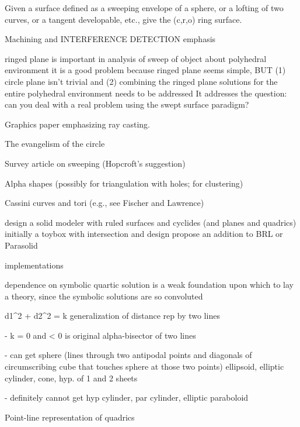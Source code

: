 Given a surface defined as a sweeping envelope of a sphere,
or a lofting of two curves, or a tangent developable, etc.,
give the (c,r,o) ring surface.




Machining and INTERFERENCE DETECTION emphasis

ringed \cap plane is important in analysis of sweep of object about polyhedral
environment
	it is a good problem because ringed \cap plane seems simple,
	BUT (1) circle \cap plane isn't trivial and
	    (2) combining the ringed \cap plane solutions for the entire
		polyhedral environment needs to be addressed
	It addresses the question: can you deal with a real problem using 
		the swept surface paradigm?

Graphics paper emphasizing ray casting.

The evangelism of the circle

Survey article on sweeping (Hopcroft's suggestion)

Alpha shapes (possibly for triangulation with holes; for clustering)

Cassini curves and tori (e.g., see Fischer and Lawrence)


design a solid modeler with ruled surfaces and cyclides (and planes and 
	quadrics)
	initially a toybox with intersection and design
	propose an addition to BRL or Parasolid

implementations

dependence on symbolic quartic solution is a weak foundation upon which to
	lay a theory, since the symbolic solutions are so convoluted



d1^{2} + \alpha d2^{2} = k generalization of distance rep by two lines

	- k = 0 and \alpha < 0 is original alpha-bisector of two lines

	- can get sphere (lines through two antipodal points and 
			  diagonals of circumscribing cube that touches
			  sphere at those two points)
		  ellipsoid, elliptic cylinder, cone, hyp. of 1 and 2 sheets

	- definitely cannot get hyp cylinder, par cylinder, 
	  elliptic paraboloid

Point-line representation of quadrics

